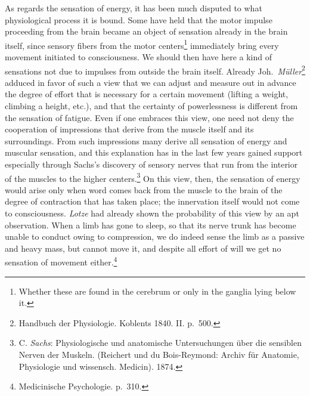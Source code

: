 \documentclass[12pt,a4paper]{book}
\newcommand{\opage}[1]{\marginnote{\footnotesize\textit{[#1]}}}
\begin{document}
As regards the sensation of energy, it has been much disputed to what
physiological process it is bound. Some have held that the motor
impulse proceeding from the brain became an object of sensation already
in the brain itself, since sensory fibers from the
motor centers\footnote{Whether these are found in the cerebrum or only
in the ganglia lying below it.} immediately bring every movement
initiated to consciousness. We should then have here a kind of
sensations not due to impulses from outside the brain itself. Already
Joh.\ \emph{Müller}\footnote{Handbuch der Physiologie. Koblents 1840.
II. p.~500.} adduced in favor of such a view that we can adjust and
measure out in advance the degree of effort that is necessary for a
certain movement (lifting a weight, climbing a height, etc.), and that
the certainty of
\opage{146}powerlessness is different from the sensation of fatigue.
Even if one embraces this view, one need not deny the cooperation of
impressions that derive from the muscle itself and its surroundings.
From such impressions many derive all sensation of energy and muscular
sensation, and this explanation has in the last few years gained
support especially through Sachs's discovery of sensory nerves that run
from the interior of the muscles to the
higher centers.\footnote{C. \emph{Sachs}: Physiologische und
anatomische Untersuchungen über die sensiblen Nerven der Muskeln.
(Reichert und du Bois-Reymond: Archiv für Anatomie, Physiologie und
wissensch. Medicin). 1874.} On this view, then, the sensation of energy
would arise only when word comes back from the muscle to the brain of
the degree of contraction that has taken place; the innervation itself
would not come to consciousness. \emph{Lotze} had already shown the
probability of this view by an apt observation. When a limb has gone to
sleep, so that its nerve trunk has become unable to conduct owing to
compression, we do indeed sense the limb as a passive and heavy mass,
but cannot move it, and despite all effort of will we get no
sensation of movement either.\footnote{Medicinische Psychologie.
p.~310.}
\end{document}
